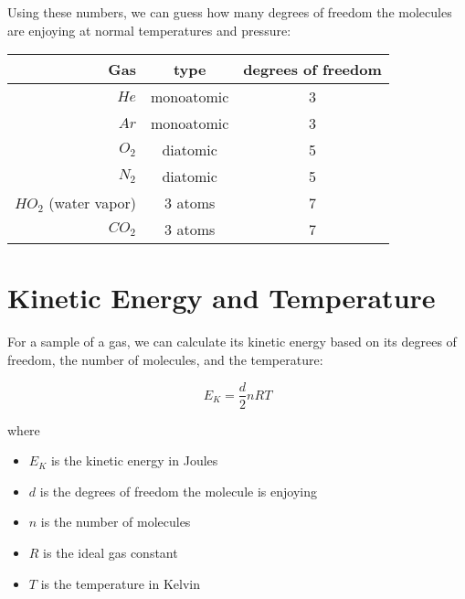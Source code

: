 Using these numbers, we can guess how many degrees of freedom the molecules are enjoying at normal temperatures and pressure:

\begin{tabular}{r|c|c}
Gas & type & degrees of freedom \\
\hline
$He$ &  monoatomic & 3 \\
$Ar$ & monoatomic & 3 \\
$O_2$ & diatomic & 5 \\
$N_2$ & diatomic & 5\\
$HO_2$ (water vapor) & 3 atoms &  7 \\
$CO_2$ & 3 atoms & 7 \\
\end{tabular}

\section{Kinetic Energy and Temperature}

For a sample of a gas, we can calculate its kinetic energy based on its degrees of freedom,  the number of molecules, and the temperature:

$$E_K = \frac{d}{2} n R T$$

where

\begin{itemize}
\item $E_K$ is the kinetic energy in Joules
\item $d$ is the degrees of freedom the molecule is enjoying
\item $n$ is the number of molecules
\item $R$ is the ideal gas constant
\item $T$ is the temperature in Kelvin
\end{itemize}


